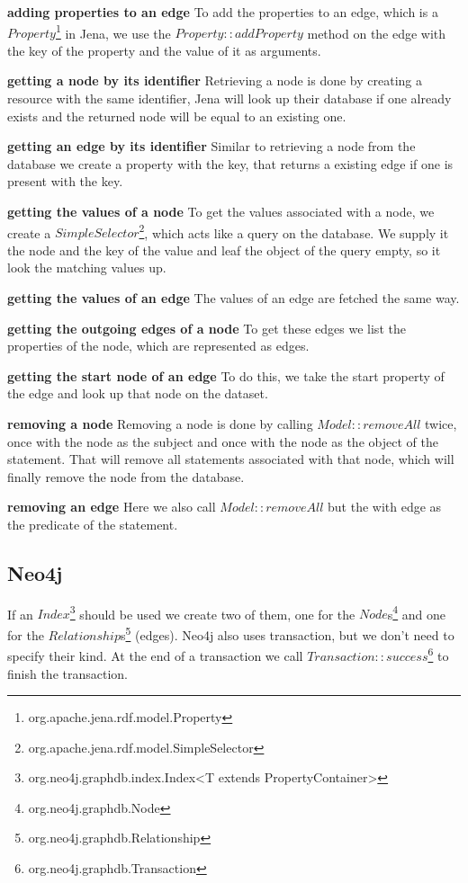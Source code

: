 \textbf{adding properties to an edge} \newline
To add the properties to an edge,
which is a $ Property $\footnote{org.apache.jena.rdf.model.Property} in Jena,
we use the $ Property::addProperty $ method on the edge with the key of the property and the value of it as arguments.

\textbf{getting a node by its identifier} \newline
Retrieving a node is done by creating a resource with the same identifier,
Jena will look up their database if one already exists and the returned node will be equal to an existing one.

\textbf{getting an edge by its identifier} \newline
Similar to retrieving a node from the database we create a property with the key,
that returns a existing edge if one is present with the key.

\textbf{getting the values of a node} \newline
To get the values associated with a node,
we create a $ SimpleSelector $\footnote{org.apache.jena.rdf.model.SimpleSelector},
which acts like a query on the database.
We supply it the node and the key of the value and leaf the object of the query empty,
so it look the matching values up.

\textbf{getting the values of an edge} \newline
The values of an edge are fetched the same way.

\textbf{getting the outgoing edges of a node} \newline
To get these edges we list the properties of the node,
which are represented as edges.

\textbf{getting the start node of an edge} \newline
To do this,
we take the start property of the edge and look up that node on the dataset.

\textbf{removing a node} \newline
Removing a node is done by calling $ Model::removeAll $ twice,
once with the node as the subject and once with the node as the object of the statement.
That will remove all statements associated with that node,
which will finally remove the node from the database.

\textbf{removing an edge} \newline
Here we also call $ Model::removeAll $ but the with edge as the predicate of the statement.

\subsection{Neo4j}
If an $ Index $\footnote{org.neo4j.graphdb.index.Index<T extends PropertyContainer>} should be used we create two of them,
one for the $ Node $s\footnote{org.neo4j.graphdb.Node} and one for the $ Relationship $s\footnote{org.neo4j.graphdb.Relationship} (edges).
Neo4j also uses transaction,
but we don't need to specify their kind.
At the end of a transaction we call $ Transaction::success $\footnote{org.neo4j.graphdb.Transaction} to finish the transaction.

